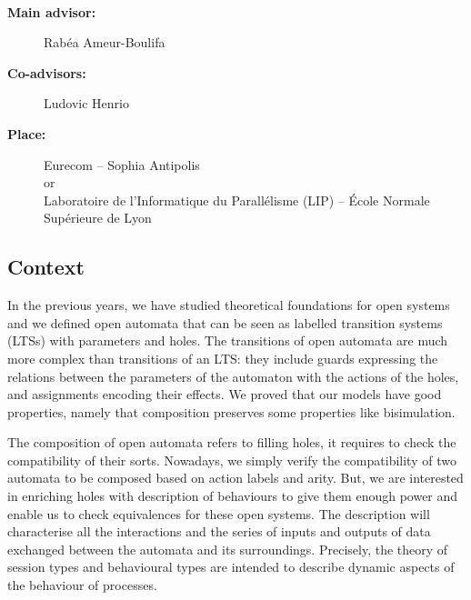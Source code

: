\documentclass[11pt,fleqn]{article}
\begin{document}
\begin{center}
\\\bigskip
{}
\end{center}
\medskip

\begin{description}
\item[\bf Main advisor:] Rabéa Ameur-Boulifa 
\item[\bf Co-advisors:] Ludovic Henrio 
\item[\bf Place:] Eurecom  -- Sophia Antipolis
\\
or\\
Laboratoire de l'Informatique du Parallélisme (LIP) --
  \'Ecole Normale Supérieure de Lyon
\end{description}

\subsection*{Context}




In the previous years, we have studied theoretical foundations for open
systems and we defined  open automata \cite{arxiv-weakbisim,henrio:Forte2016,hou:hal-02406098} that can be seen as labelled transition systems (LTSs) with parameters and holes. The transitions of open
automata are much more complex than transitions of an LTS: they include guards expressing the relations between the parameters of the automaton with the actions of the holes, and assignments encoding their effects.
 We proved that our models 
have good properties, namely that composition preserves some properties like bisimulation.



The composition of open automata refers to filling holes, it requires to check the compatibility of their sorts. Nowadays, we simply verify the compatibility of two automata to be composed based on   action labels and  arity. But, 
 we are interested in enriching holes with description of behaviours to give them enough power and enable us to check equivalences for these open systems. The description will characterise all the
interactions and the series of inputs and outputs of data exchanged between the automata and its surroundings. Precisely, the theory of session types and behavioural types  \cite{Fantechi:MLTCDP2019} are intended  to describe dynamic aspects of the behaviour of processes.
\end{document}
